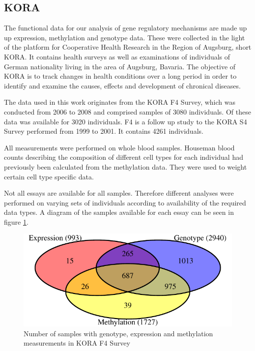 \documentclass[a4paper,12pt]{article}
\begin{document}
\subsection{KORA}
The functional data for our analysis of gene regulatory mechanisms are made up up expression, methylation and genotype data. These were collected in the light of the platform for Cooperative Health Research in the Region of Augsburg, short KORA. It contains health surveys as well as examinations of individuals of German nationality living in the area of Augsburg, Bavaria.
The objective of KORA is to track changes in health conditions over a long period in order to identify and examine the causes, effects and development of chronical diseases.

The data used in this work originates from the KORA F4 Survey, which was conducted from 2006 to 2008 and comprised samples of 3080 individuals. Of these data was available for 3020 individuals. F4 is a follow up study to the KORA S4 Survey performed from 1999 to 2001. It contains 4261 individuals. 

All measurements were performed on whole blood samples. Houseman blood counts\cite{10.3389/fgene.2016.00023} describing the composition of different cell types for each individual had previously been calculated from the methylation data. They were used to weight certain cell type specific data. 

Not all essays are available for all samples. Therefore different analyses were performed on varying sets of individuals according to availability of the required data types. A diagram of the samples available for each essay can be seen in figure \ref{fig:samples.venn}. 

\begin{figure}[tb]
\begin{center}
	\includegraphics[scale = 1, keepaspectratio = true]{../figures/samples_venn}  
	\caption{Number of samples with genotype, expression and methylation measurements in KORA F4 Survey}
    \label{fig:samples.venn}
\end{center}
\end{figure}
\end{document}
